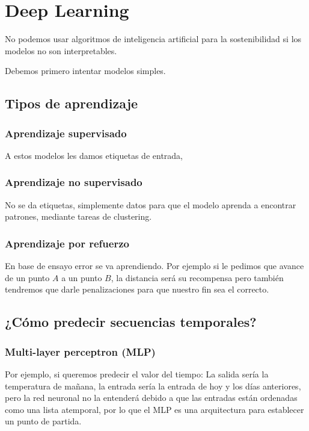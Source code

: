 \chapter{Deep Learning}
No podemos usar algoritmos de inteligencia artificial para la sostenibilidad  si los modelos no son interpretables. 

Debemos primero intentar modelos simples.


\section{Tipos de aprendizaje}

\subsection{Aprendizaje supervisado}
A estos modelos les damos etiquetas de entrada,

\subsection{Aprendizaje no supervisado}
No se da etiquetas, simplemente datos para que el modelo aprenda a encontrar patrones, mediante tareas de clustering.

\subsection{Aprendizaje por refuerzo}
En base de ensayo error se va aprendiendo. Por ejemplo si le pedimos que avance de un punto $A$ a un punto $B$, la distancia será su recompensa pero también tendremos que darle penalizaciones para que nuestro fin sea el correcto.

\section{¿Cómo predecir secuencias temporales?}

\subsection{Multi-layer perceptron (MLP)}
Por ejemplo, si queremos predecir el valor del tiempo: La salida sería la temperatura de mañana, la entrada sería la entrada de hoy y los días anteriores, pero la red neuronal no la entenderá debido a que las entradas están ordenadas como una lista atemporal, por lo que el MLP es una arquitectura para establecer un punto de partida.

